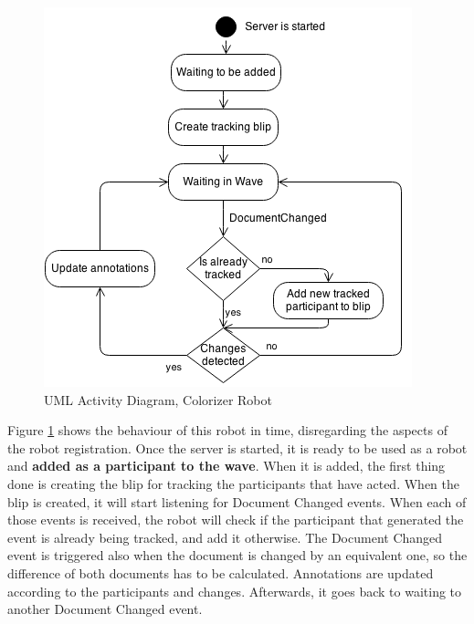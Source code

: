 \begin{figure}[H]
  \center
    \includegraphics[keepaspectratio, scale=0.65]{Media/Diagrams/Robot/RobotActivity.png}
  \caption{UML Activity Diagram, Colorizer Robot}
  \label{fig:colorizer_activity_diagram}
\end{figure}
Figure \ref{fig:colorizer_activity_diagram} shows the behaviour of this robot in time, disregarding the aspects of the robot registration. Once the server is started, it is ready to be used as a robot and \textbf{added as a participant to the wave}. When it is added, the first thing done is creating the blip for tracking the participants that have acted. When the blip is created, it will start listening for Document Changed events. When each of those events is received, the robot will check if the participant that generated the event is already being tracked, and add it otherwise. The Document Changed event is triggered also when the document is changed by an equivalent one, so the difference of both documents has to be calculated. Annotations are updated according to the participants and changes. Afterwards, it goes back to waiting to another Document Changed event.


